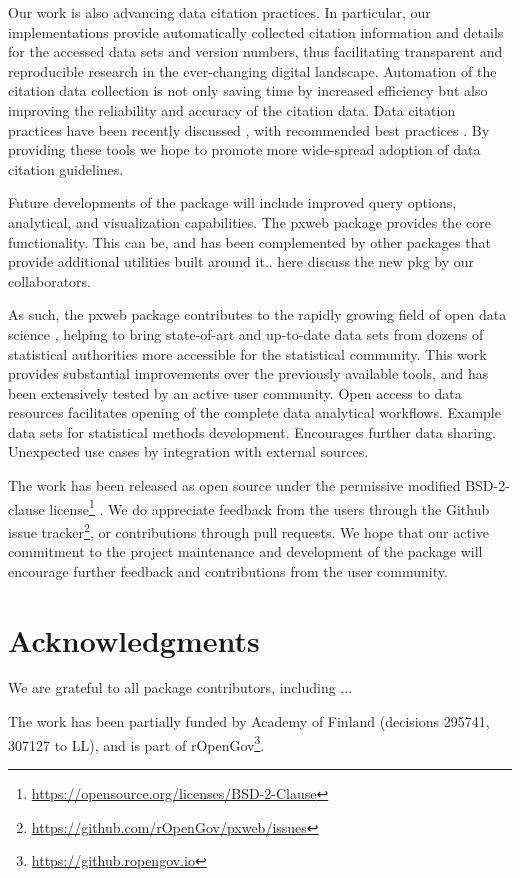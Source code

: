 \documentclass[article]{jss}
\begin{document}
Our work is also advancing data citation practices. In particular, our implementations provide automatically collected citation information and details for the accessed data sets and version numbers, thus facilitating transparent and reproducible research in the ever-changing digital landscape. Automation of the citation data collection  is not only saving time by increased efficiency but also improving the reliability and accuracy of the citation data. Data citation practices have been recently discussed \cite{xxx}, with recommended best practices \cite{xxx}. By providing these tools we hope to promote more wide-spread adoption of data citation guidelines.

Future developments of the package will include improved query options, analytical, and visualization capabilities. The pxweb package provides the core functionality. This can be, and has been complemented by other packages that provide additional utilities built around it.. here discuss the new pkg by our collaborators.

As such, the pxweb package contributes to the rapidly growing field of open data science \cite{xxx}, helping to bring state-of-art and up-to-date data sets from dozens of statistical authorities more accessible for the statistical community. This work provides substantial improvements over the previously available tools, and has been extensively tested by an active user community. Open access to data resources facilitates opening of the complete data analytical workflows. Example data sets for statistical methods development. Encourages further data sharing. Unexpected use cases by integration with external sources.

The work has been released as open source under the permissive modified BSD-2-clause license\footnote{\url{https://opensource.org/licenses/BSD-2-Clause}} \cite{guide-to-scientist-programmer}. We do appreciate feedback from the users through the Github issue tracker\footnote{\url{https://github.com/rOpenGov/pxweb/issues}}, or contributions through pull requests. We hope that our active commitment to the project maintenance and development of the package will encourage further feedback and contributions from the user community.

\section*{Acknowledgments}

We are grateful to all package contributors, including ... 

The work has been partially funded by Academy of Finland (decisions 295741, 307127 to LL), and is part of rOpenGov\footnote{\url{https://github.ropengov.io}}.
\end{document}
